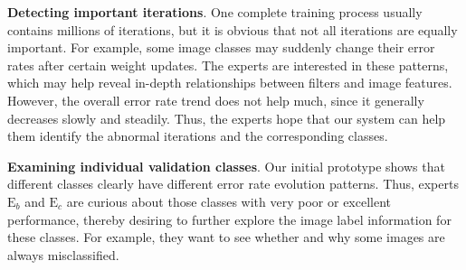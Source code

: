 \documentclass[format=acmsmall, review=false, screen=true]{acmart}
\newcommand{\eb}{{$\mathrm{E}_b$}\xspace}
\newcommand{\ec}{{$\mathrm{E}_c$}\xspace}
\begin{document}
	\item \textbf{Detecting important iterations}.
	One complete training process usually contains millions of iterations, but it is obvious that not all iterations are equally important.
	For example, some image classes may suddenly change their error rates after certain weight updates.
	The experts are interested in these patterns, which may help reveal in-depth relationships between filters and image features.
	However, the overall error rate trend does not help much, since it generally decreases slowly and steadily.
	Thus, the experts hope that our system can help them identify the abnormal iterations and the corresponding classes.


	\item \textbf{Examining individual validation classes}.
	Our initial prototype shows that different classes clearly have different error rate evolution patterns.
	Thus, experts \eb and \ec are curious about those classes with very poor or excellent performance, thereby desiring to further explore the image label information for these classes.
	For example, they want to see whether and why some images are always misclassified.
\end{document}
